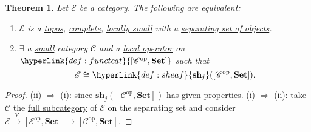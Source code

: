 \documentclass{article}
\newcommand{\sh}{\mathbf{sh}}
\newtheorem{nthm}{Theorem}[section]
\begin{document}
\begin{nthm}\label{thm:7.23}
  Let $\mathscr{E}$ be a \hyperlink{def:cat}{category}. The following are equivalent:
  \begin{enumerate}[label=(\roman*)]
    \item $\mathscr{E}$ is a \hyperlink{def:topos}{topos}, \hyperlink{def:complete}{complete}, \hyperlink{def:lsmall}{locally small} with a \hyperlink{def:separating}{separating set of objects}.
    \item $\exists$ a \hyperlink{def:small}{small} category $\mathscr{C}$ and a \hyperlink{def:lop}{local operator} on $\hyperlink{def:functcat}{[\mathscr{C}^{\text{op}}, \mathbf{Set}]}$ such that
      \begin{equation*}
        \mathscr{E} \cong \hyperlink{def:sheaf}{\sh_j}([\mathscr{C}^{\text{op}}, \mathbf{Set}]).
      \end{equation*}
  \end{enumerate}
\end{nthm}
\begin{proof}
  (ii) $\Rightarrow$ (i): since $\sh_j([\mathscr{C}^{\text{op}}, \mathbf{Set}])$ has given properties.
  (i) $\Rightarrow$ (ii): take $\mathscr{C}$ the \hyperlink{def:fulls}{full subcategory} of $\mathscr{E}$ on the separating set and consider $\mathscr{E} \xrightarrow{Y} [\mathscr{E}^{\text{op}}, \mathbf{Set}] \to [\mathscr{C}^{\text{op}}, \mathbf{Set}]$.
\end{proof}
\printindex
 
\end{document}
